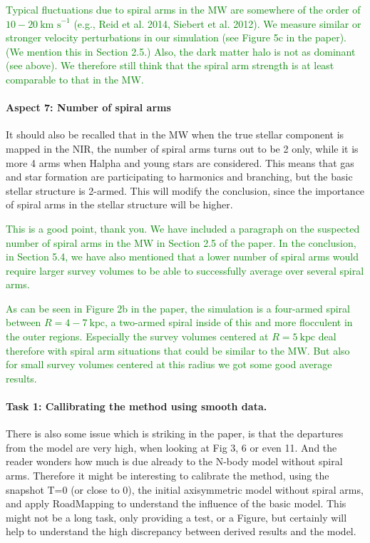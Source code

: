 \documentclass[10pt,a4paper]{article}
\newcommand{\Answer}[1]{\textcolor{Green}{#1}}
\begin{document}
\Answer{Typical fluctuations due to spiral arms in the MW are somewhere of the order of $10-20~\text{km s}^{-1}$ (e.g., Reid et al. 2014, Siebert et al. 2012). We measure similar or stronger velocity perturbations in our simulation (see Figure 5c in the paper). (We mention this in Section 2.5.) Also, the dark matter halo is not as dominant (see above). We therefore still think that the spiral arm strength is at least comparable to that in the MW.}

\paragraph{Aspect 7: Number of spiral arms} It should also be recalled that in the MW when the true stellar component is mapped
in the NIR, the number of spiral arms turns out to be 2 only, while it is more 4
arms when Halpha and young stars are considered. This means that gas and star
formation are participating to harmonics and branching, but the basic stellar
structure is 2-armed. This will modify the conclusion, since the importance of
spiral arms in the stellar structure will be higher.

\Answer{This is a good point, thank you. We have included a paragraph on the suspected number of spiral arms in the MW in Section 2.5 of the paper. In the conclusion, in Section 5.4, we have also mentioned that a lower number of spiral arms would require larger survey volumes to be able to successfully average over several spiral arms.}

\Answer{As can be seen in Figure 2b in the paper, the simulation is a four-armed spiral between $R=4-7~\text{kpc}$, a two-armed spiral inside of this and more flocculent in the outer regions. Especially the survey volumes centered at $R=5~\text{kpc}$ deal therefore with spiral arm situations that could be similar to the MW. But also for small survey volumes centered at this radius we got some good average results.}

\paragraph{Task 1: Callibrating the method using smooth data.} There is also some issue which is striking in the paper, is that the departures from
the model are very high, when looking at Fig 3, 6 or even 11. And the reader wonders
how much is due already to the N-body model without spiral arms. Therefore it might
be interesting to calibrate the method, using the snapshot T=0 (or close to 0), the
initial axisymmetric model without spiral arms, and apply RoadMapping to understand
the  influence of the basic model. This might not be a long task, only providing a
test, or a Figure, but certainly will help to understand the high discrepancy
between derived results and the model.
\end{document}
